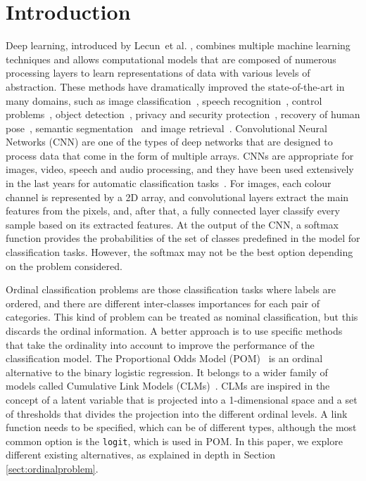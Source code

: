 \documentclass[preprint]{elsarticle}
\begin{document}
\section{Introduction}
\label{sect:introduction}
Deep learning, introduced by Lecun~et al. \cite{lecun2015deep}, combines multiple machine learning techniques and allows computational models that are composed of numerous processing layers to learn representations of data with various levels of abstraction. These methods have dramatically improved the state-of-the-art in many domains, such as image classification~\cite{yu2017convolutional,fang2019image,zhu2019image}, speech recognition~\cite{song2018music,liu2018speech}, control problems~\cite{mnih2015human}, object detection~\cite{sun2018face,chu2018deep,olmos2018automatic}, privacy and security protection~\cite{tan2018deep,yuan2019adversarial}, recovery of human pose~\cite{hong2015multimodal}, semantic segmentation~\cite{li2019deep} and image retrieval~\cite{tzelepi2018deep,qayyum2017medical,bai2018optimization}. Convolutional Neural Networks (CNN) are one of the types of deep networks that are designed to process data that come in the form of multiple arrays. CNNs are appropriate for images, video, speech and audio processing, and they have been used extensively in the last years for automatic classification tasks~\cite{dong2014learning,ronneberger2015u}. For images, each colour channel is represented by a 2D array, and convolutional layers extract the main features from the pixels, and, after that, a fully connected layer classify every sample based on its extracted features. At the output of the CNN, a softmax function provides the probabilities of the set of classes predefined in the model for classification tasks. However, the softmax may not be the best option depending on the problem considered.

Ordinal classification problems are those classification tasks where labels are ordered, and there are different inter-classes importances for each pair of categories. This kind of problem can be treated as nominal classification, but this discards the ordinal information. A better approach is to use specific methods that take the ordinality into account to improve the performance of the classification model. The Proportional Odds Model (POM)~\cite{mccullagh1980regression} is an ordinal alternative to the binary logistic regression. It belongs to a wider family of models called Cumulative Link Models (CLMs)~\cite{agresti2010analysis}. CLMs are inspired in the concept of a latent variable that is projected into a 1-dimensional space and a set of thresholds that divides the projection into the different ordinal levels. A link function needs to be specified, which can be of different types, although the most common option is the \texttt{logit}, which is used in POM. In this paper, we explore different existing alternatives, as explained in depth in Section \ref{sect:ordinalproblem}.
\end{document}
